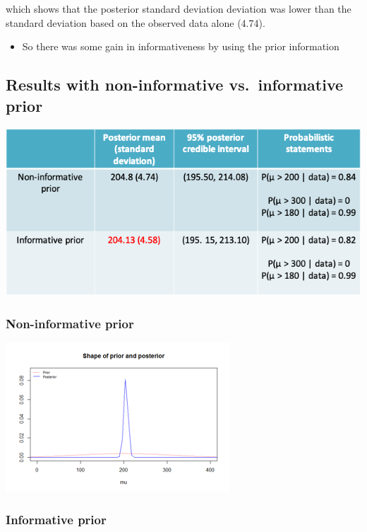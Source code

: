 \documentclass[
]{book}
\providecommand{\tightlist}{%
  \setlength{\itemsep}{0pt}\setlength{\parskip}{0pt}}
\begin{document}
which shows that the posterior standard deviation deviation was lower than the standard deviation based on the observed data alone (4.74).

\begin{itemize}
\tightlist
\item
  So there was some gain in informativeness by using the prior information
\end{itemize}

\hypertarget{results-with-non-informative-vs.-informative-prior}{%
\subsection{Results with non-informative vs.~informative prior}\label{results-with-non-informative-vs.-informative-prior}}

\includegraphics[width=1\linewidth]{./6_33}

\hypertarget{non-informative-prior-1}{%
\subsubsection{Non-informative prior}\label{non-informative-prior-1}}

\includegraphics[width=0.5\linewidth]{./6_34a}

\hypertarget{informative-prior}{%
\subsubsection{Informative prior}\label{informative-prior}}
\end{document}
